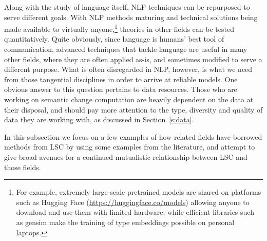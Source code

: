 \documentclass[output=paper]{langscibook}
\begin{document}
Along with the study of language itself, NLP techniques can be repurposed to serve different goals.
With NLP methods maturing and technical solutions being made available to virtually anyone,\footnote{For example, extremely large-scale pretrained models are shared on platforms such as Hugging Face (\url{https://huggingface.co/models}) allowing anyone to download and use them with limited hardware; while efficient libraries such as gensim \citep{rehurek_lrec} make the training of type embeddings possible on personal laptops.} theories in other fields can be tested quantitatively. 
Quite obviously, since language is humans' best tool of communication, advanced techniques that tackle language are useful in many other fields, where they are often applied as-is, and sometimes modified to serve a different purpose.
What is often disregarded in NLP, however, is what we need from those tangential disciplines in order to arrive at reliable models.
One obvious answer to this question pertains to data resources. Those who are working on semantic change computation are heavily dependent on the data at their disposal, and should pay more attention to the type, diversity and quality of data they are working with, as discussed in Section~\ref{s:data}.

In this subsection we focus on a few examples of how related fields have borrowed methods from LSC by using some examples from the literature, and attempt to give broad avenues for a continued mutualistic relationship between LSC and those fields.\largerpage[2]
\end{document}
